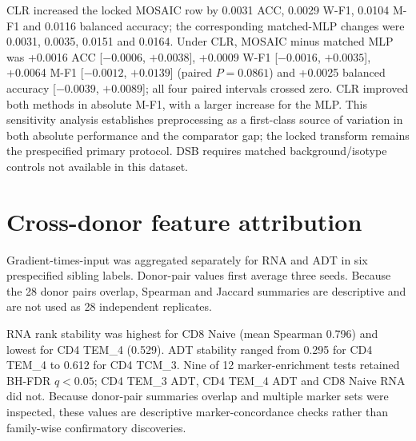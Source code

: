 \documentclass[10pt]{article}
\begin{document}
\begin{table}[H]
\centering
\caption{Locked versus CLR ADT preprocessing sensitivity. Each method has 24 fold--seed units (eight held-out donors and three seeds); values are donor means with two-sided 95\% Student-$t$ intervals. The paired MOSAIC--MLP comparison is reported in the text below.}
\label{tab:clr-sensitivity}
\scriptsize
\setlength{\tabcolsep}{2.5pt}
\resizebox{\textwidth}{!}{%

}
\end{table}

CLR increased the locked MOSAIC row by 0.0031 ACC, 0.0029 W-F1, 0.0104 M-F1 and 0.0116 balanced accuracy; the corresponding matched-MLP changes were 0.0031, 0.0035, 0.0151 and 0.0164. Under CLR, MOSAIC minus matched MLP was +0.0016 ACC [$-0.0006$, $+0.0038$], +0.0009 W-F1 [$-0.0016$, $+0.0035$], +0.0064 M-F1 [$-0.0012$, $+0.0139$] (paired $P=0.0861$) and +0.0025 balanced accuracy [$-0.0039$, $+0.0089$]; all four paired intervals crossed zero. CLR improved both methods in absolute M-F1, with a larger increase for the MLP. This sensitivity analysis establishes preprocessing as a first-class source of variation in both absolute performance and the comparator gap; the locked transform remains the prespecified primary protocol. DSB requires matched background/isotype controls not available in this dataset.

\section{Cross-donor feature attribution}

Gradient-times-input was aggregated separately for RNA and ADT in six prespecified sibling labels. Donor-pair values first average three seeds. Because the 28 donor pairs overlap, Spearman and Jaccard summaries are descriptive and are not used as 28 independent replicates.

\begin{table}[H]
\centering
\caption{Cross-donor attribution stability and canonical-marker enrichment. Marker overlap is the fraction of available canonical markers appearing in the aggregate top 20. BH-FDR values adjust the 12 marker-enrichment permutation tests.}
\label{tab:attribution}
\scriptsize
\setlength{\tabcolsep}{3pt}
\resizebox{\textwidth}{!}{%

}
\end{table}

RNA rank stability was highest for CD8 Naive (mean Spearman 0.796) and lowest for CD4 TEM\_4 (0.529). ADT stability ranged from 0.295 for CD4 TEM\_4 to 0.612 for CD4 TCM\_3. Nine of 12 marker-enrichment tests retained BH-FDR $q<0.05$; CD4 TEM\_3 ADT, CD4 TEM\_4 ADT and CD8 Naive RNA did not. Because donor-pair summaries overlap and multiple marker sets were inspected, these values are descriptive marker-concordance checks rather than family-wise confirmatory discoveries.
\end{document}
